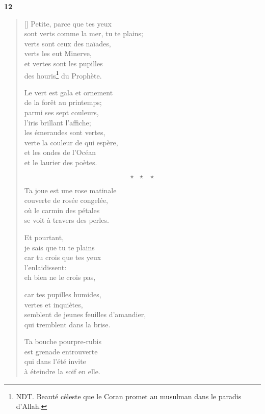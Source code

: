 \documentclass[a4paper,12pt]{book}
\begin{document}
\bigskip

\begin{center}
  \textbf{12}
\end{center}

\settowidth{\versewidth}{Petite, parce que tes yeux}

\begin{verse}[\versewidth]
  Petite, parce que tes yeux \\
  sont verts comme la mer, tu te plains; \\
  verts sont ceux des naïades, \\
  verts les eut Minerve, \\
  et vertes sont les pupilles \\
  des houris\footnote{NDT. Beauté céleste que le Coran promet au musulman dans le paradis d'Allah.} du Prophète.

  Le vert est gala et ornement \\
  de la forêt au printemps; \\
  parmi ses sept couleurs, \\
  l'iris brillant l'affiche; \\
  les émeraudes sont vertes, \\
  verte la couleur de qui espère, \\
  et les ondes de l'Océan \\
  et le laurier des poètes.

  $$\star \ \ \ \star \ \ \ \star$$

  Ta joue est une rose matinale \\
  couverte de rosée congelée, \\
  où le carmin des pétales \\
  se voit à travers des perles.

  Et pourtant, \\
  je sais que tu te plains \\
  car tu crois que tes yeux \\
  l'enlaidissent: \\
  eh bien ne le crois pas,

  car tes pupilles humides, \\
  vertes et inquiètes, \\
  semblent de jeunes feuilles d'amandier, \\
  qui tremblent dans la brise.

  Ta bouche pourpre-rubis \\
  est grenade entrouverte \\
  qui dans l'été invite \\
  à éteindre la soif en elle.


\end{verse}
\end{document}
